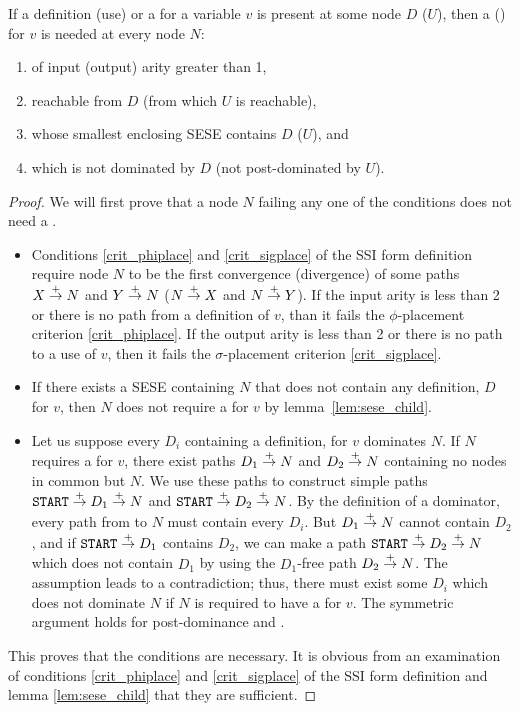 \documentclass[12pt,titlepage,twoside]{article}
\begin{document}
\begin{lemma}\label{lem:ssi_place_dom}
If a definition (use) or a \phisigfunction[or]{} for a variable $v$ is
present at some node $D$ (\/$U$), then a \phifunction (\sigfunction) for
$v$ is needed at every node $N$:
\begin{enumerate}
\item of input (output) arity greater than 1,
\item reachable from $D$ (from which $U$ is reachable),
\item whose smallest enclosing SESE contains $D$ (\/$U$), and
\item which is not dominated by $D$ (not post-dominated by $U$).
\end{enumerate}
\end{lemma}
\begin{proof}
We will first prove that a node $N$ failing any one of the conditions does
not need a \phisigfunction[or].
\begin{itemize}
\item Conditions \ref{crit_phiplace} and \ref{crit_sigplace} of the
SSI form definition require node $N$ to be the first convergence
(divergence) of some paths $X \stackrel{+}{\rightarrow} N$ and $Y \stackrel{+}{\rightarrow} N$ ($N
\stackrel{+}{\rightarrow} X$ and $N \stackrel{+}{\rightarrow} Y$).  If the input arity is less than 2
or there is no path from a definition of $v$, than it fails the
$\phi$-placement criterion \ref{crit_phiplace}.  If the output arity
is less than 2 or there is no path to a use of $v$, then it fails the
$\sigma$-placement criterion \ref{crit_sigplace}.
\item If there exists a SESE containing $N$ that does not contain any
definition, \phisigfunction[or]{} $D$ for $v$, then $N$ does not require a
\phisigfunction[or]{} for $v$ by lemma~\ref{lem:sese_child}.
\item Let us suppose every $D_i$ containing a definition,
\phisigfunction[or]{} for $v$ dominates $N$.  If $N$ requires a
\phifunction for $v$,  there exist paths $D_1 \stackrel{+}{\rightarrow} N$ and
$D_2 \stackrel{+}{\rightarrow} N$ containing no nodes in common but $N$.  We use these
paths to construct simple paths $\texttt{START}\stackrel{+}{\rightarrow} D_1 \stackrel{+}{\rightarrow} N$ and
$\texttt{START}\stackrel{+}{\rightarrow} D_2 \stackrel{+}{\rightarrow} N$.  By the definition of a
dominator, every path from  to $N$ must contain every
$D_i$.  But $D_1 \stackrel{+}{\rightarrow} N$ cannot contain $D_2$, and if
$\texttt{START} \stackrel{+}{\rightarrow} D_1$ contains $D_2$, we can make a path
$\texttt{START} \stackrel{+}{\rightarrow} D_2 \stackrel{+}{\rightarrow} N$ which does not contain $D_1$
by using the $D_1$-free path $D_2 \stackrel{+}{\rightarrow} N$.  The assumption leads
to a contradiction; thus, there must exist some $D_i$ which does not
dominate $N$ if $N$ is required to have a \phifunction for $v$.  The
symmetric argument holds for post-dominance and .
\end{itemize}
This proves that the conditions are necessary.  It is obvious from an
examination of conditions \ref{crit_phiplace} and \ref{crit_sigplace}
of the SSI form definition and lemma \ref{lem:sese_child} that they are
sufficient.
\end{proof}
\end{document}
